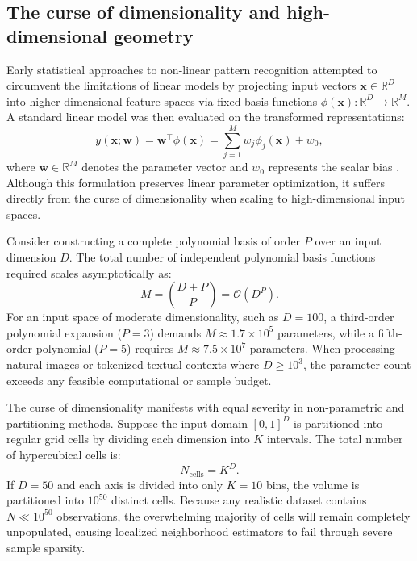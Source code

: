 \documentclass[../../main.tex]{subfiles}
\begin{document}
\subsection{The curse of dimensionality and high-dimensional geometry}
\label{subsec:curse_of_dimensionality}

Early statistical approaches to non-linear pattern recognition attempted to circumvent the limitations of linear models by projecting input vectors $\mathbf{x} \in \mathbb{R}^D$ into higher-dimensional feature spaces via fixed basis functions $\phi(\mathbf{x}): \mathbb{R}^D \to \mathbb{R}^M$. A standard linear model was then evaluated on the transformed representations:
\begin{equation}
y(\mathbf{x}; \mathbf{w}) = \mathbf{w}^\top \phi(\mathbf{x}) = \sum_{j=1}^M w_j \phi_j(\mathbf{x}) + w_0,
\end{equation}
where $\mathbf{w} \in \mathbb{R}^M$ denotes the parameter vector and $w_0$ represents the scalar bias \citep{bishop2024deep}. Although this formulation preserves linear parameter optimization, it suffers directly from the curse of dimensionality when scaling to high-dimensional input spaces.

Consider constructing a complete polynomial basis of order $P$ over an input dimension $D$. The total number of independent polynomial basis functions required scales asymptotically as:
\begin{equation}
M = \binom{D + P}{P} = \mathcal{O}\left(D^P\right).
\end{equation}
For an input space of moderate dimensionality, such as $D = 100$, a third-order polynomial expansion ($P = 3$) demands $M \approx 1.7 \times 10^5$ parameters, while a fifth-order polynomial ($P = 5$) requires $M \approx 7.5 \times 10^7$ parameters. When processing natural images or tokenized textual contexts where $D \ge 10^3$, the parameter count exceeds any feasible computational or sample budget.

The curse of dimensionality manifests with equal severity in non-parametric and partitioning methods. Suppose the input domain $[0, 1]^D$ is partitioned into regular grid cells by dividing each dimension into $K$ intervals. The total number of hypercubical cells is:
\begin{equation}
N_{\text{cells}} = K^D.
\end{equation}
If $D = 50$ and each axis is divided into only $K = 10$ bins, the volume is partitioned into $10^{50}$ distinct cells. Because any realistic dataset contains $N \ll 10^{50}$ observations, the overwhelming majority of cells will remain completely unpopulated, causing localized neighborhood estimators to fail through severe sample sparsity.
\end{document}
